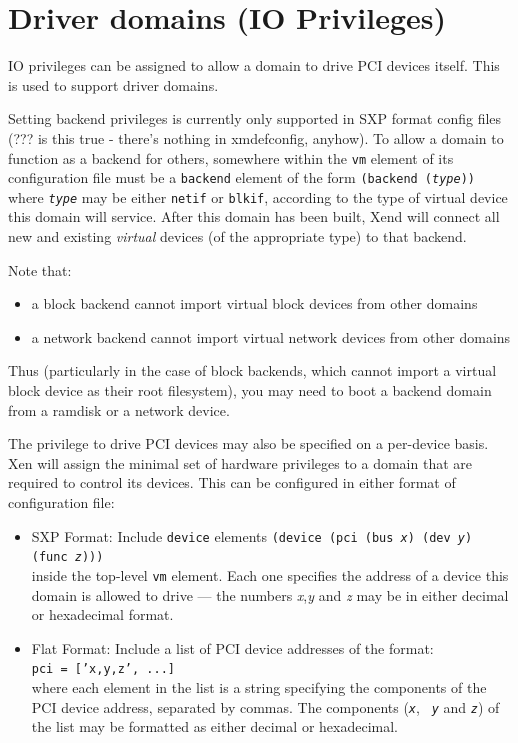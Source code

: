 \documentclass[11pt,twoside,final,openright]{xenstyle}
\begin{document}
{\section{Driver domains (IO Privileges)}

IO privileges can be assigned to allow a domain to drive PCI devices
itself.  This is used to support driver domains.

Setting backend privileges is currently only supported in SXP format
config files (??? is this true - there's nothing in xmdefconfig,
anyhow).  To allow a domain to function as a backend for others,
somewhere within the {\tt vm} element of its configuration file must
be a {\tt backend} element of the form {\tt (backend ({\em type}))}
where {\tt \em type} may be either {\tt netif} or {\tt blkif},
according to the type of virtual device this domain will service.
After this domain has been built, Xend will connect all new and
existing {\em virtual} devices (of the appropriate type) to that
backend.

Note that:
\begin{itemize}
\item a block backend cannot import virtual block devices from other
domains
\item a network backend cannot import virtual network devices from
other domains
\end{itemize}

Thus (particularly in the case of block backends, which cannot import
a virtual block device as their root filesystem), you may need to boot
a backend domain from a ramdisk or a network device.

The privilege to drive PCI devices may also be specified on a
per-device basis.  Xen will assign the minimal set of hardware
privileges to a domain that are required to control its devices.  This
can be configured in either format of configuration file:

\begin{itemize}
\item SXP Format:
  Include {\tt device} elements
  {\tt (device (pci (bus {\em x}) (dev {\em y}) (func {\em z}))) } \\
  inside the top-level {\tt vm} element.  Each one specifies the address
  of a device this domain is allowed to drive ---
  the numbers {\em x},{\em y} and {\em z} may be in either decimal or
  hexadecimal format.
\item Flat Format: Include a list of PCI device addresses of the
  format: \\ {\tt pci = ['x,y,z', ...] } \\ where each element in the
  list is a string specifying the components of the PCI device
  address, separated by commas.  The components ({\tt \em x}, {\tt \em
  y} and {\tt \em z}) of the list may be formatted as either decimal
  or hexadecimal.
\end{itemize}

}
\end{document}
